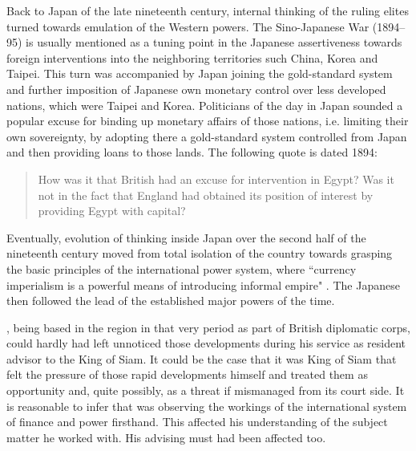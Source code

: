 Back to Japan of the late nineteenth century, internal thinking of the ruling elites turned towards emulation of the Western powers. The Sino-Japanese War (1894--95) is usually mentioned as a tuning point in the Japanese assertiveness towards foreign interventions into the neighboring territories such China, Korea and Taipei. This turn was accompanied by Japan joining the gold-standard system and further imposition of Japanese own monetary control over less developed nations, which were Taipei and Korea. Politicians of the day in Japan sounded a popular excuse for binding up monetary affairs of those nations, i.e. limiting their own sovereignty, by adopting there a gold-standard system controlled from Japan and then providing loans to those lands. The following quote is dated 1894:

\begin{quote}
How was it that British had an excuse for intervention in Egypt? Was it not in the fact that England had obtained its position of interest by providing Egypt with capital? \citep[p.~75]{schiltz2012}
\end{quote}

Eventually, evolution of thinking inside Japan over the second half of the nineteenth century moved from total isolation of the country towards grasping the basic principles of the international power system, where ``currency imperialism is a powerful means of introducing informal empire" \citep[p.~19]{schiltz2012}. The Japanese then followed the lead of the established major powers of the time. 

\citeauthor{innes1913}, being based in the region in that very period as part of British diplomatic corps, could hardly had left unnoticed those developments during his service as resident advisor to the King of Siam. It could be the case that it was King of Siam that felt the pressure of those rapid developments himself and treated them as opportunity and, quite possibly, as a threat if mismanaged from its court side. It is reasonable to infer that \citeauthor{innes1913} was observing the workings of the international system of finance and power firsthand. This affected his understanding of the subject matter he worked with. His advising must had been affected too.  

